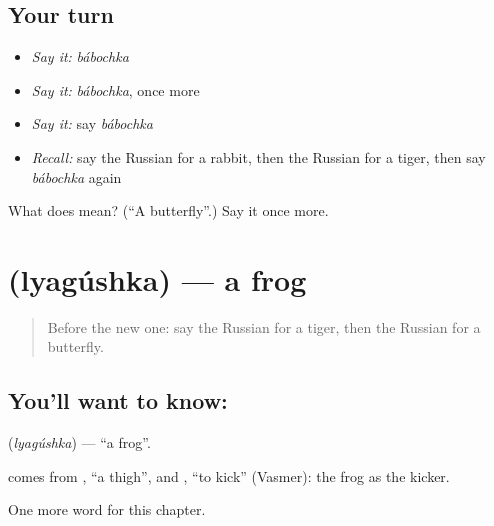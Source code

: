 \subsection*{Your turn}
\begin{itemize}
\raggedright
  \item \emph{Say it:} \emph{bábochka}
  \item \emph{Say it:} \emph{bábochka}, once more
  \item \emph{Say it:} say \emph{bábochka}
  \item \emph{Recall:} say the Russian for a rabbit, then the Russian for a tiger, then say \emph{bábochka} again
\end{itemize}

\begin{tcolorbox}[breakable,colback=teal!4,colframe=teal!35!black,title={Before you move on}]
What does  mean? (\textquotedblleft{}A butterfly\textquotedblright{}.) Say it once more.
\end{tcolorbox}
\section[\texorpdfstring{\ru{лягушка} (lyagúshka)}{лягушка (lyagúshka)}]{ (lyagúshka) — a frog}

\label{lesson:RU-C117-frog}



\begin{quote}
Before the new one: say the Russian for a tiger, then the Russian for a butterfly.
\end{quote}

\subsection*{You'll want to know: }
\textbf{} (\emph{lyagúshka}) — \textquotedblleft{}a frog\textquotedblright{}.

\begin{cousinweb}
\textbf{} comes from \emph{}, \textquotedblleft{}a thigh\textquotedblright{}, and \emph{}, \textquotedblleft{}to kick\textquotedblright{} (Vasmer): the frog as the kicker.
\end{cousinweb}

\begin{grammarlens}[title={What you've built}]
One more word for this chapter.
\end{grammarlens}

